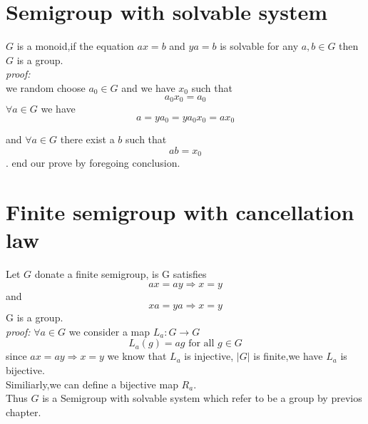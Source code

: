 \documentclass[a4paper,12pt]{article}
\begin{document}
\section{Semigroup with solvable system}
$G$ is a monoid,if the equation $ax=b$ and $ya=b$ is solvable for any $a,b \in G$ then $G$ is a group.\\
\textit{proof:} \\
we random choose $a_0 \in G$ and we have $x_0$ such that
\[ a_0x_0=a_0 \]
$\forall a \in G$ we have
\[ a = ya_0 = ya_0x_0 = ax_0 \]

and $\forall a \in G$ there exist a $b$ such that
\[ ab = x_0 \].
end our prove by foregoing conclusion.

\section{Finite semigroup with cancellation law}
Let $G$ donate a finite semigroup, is G satisfies
\[ ax=ay \Rightarrow x=y \]
and
\[ xa=ya \Rightarrow x=y \]
G is a group.\\
\textit{proof:} 
$\forall a \in G$ we consider a map $L_a \colon G \to G$
\[ L_a(g) = ag \mbox{ for all } g \in G \]
since $ ax=ay \Rightarrow x=y $
we know that $L_a$ is injective, $|G|$ is finite,we have $L_a$ is bijective.\\
Similiarly,we can define a bijective map $R_a$.\\
Thus $G$ is a Semigroup with solvable system which refer to be a group by previos chapter.
\end{document}
